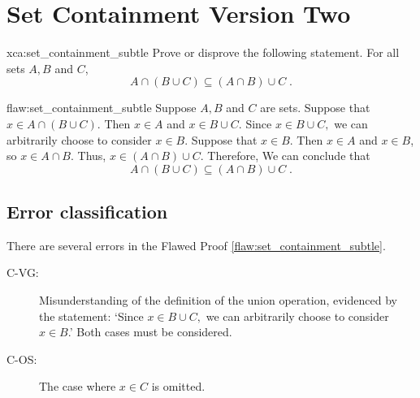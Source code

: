 \section{Set Containment Version Two}

\begin{xca}{xca:set_containment_subtle}
Prove or disprove the following statement. For all sets $A, B$ and $C$,
$$A \cap \left(B \cup C \right) \subseteq \left(A \cap B\right) \cup C\;.$$
\end{xca}

\begin{flaw}{flaw:set_containment_subtle} %
Suppose $A, B$ and $C$ are sets. Suppose that $x \in A \cap \left(B \cup C \right).$ Then $x\in A$ and $x \in B \cup C.$ Since $x \in B \cup C,$ we can arbitrarily choose to consider $x \in B$. 
Suppose that $x \in B$. Then $x \in A$ and $x \in B$, so $x \in A \cap B$. Thus, $x \in \left(A \cap B\right) \cup C.$ Therefore, We can conclude that $$A \cap \left(B \cup C \right) \subseteq \left(A \cap B\right) \cup C\;.$$
\end{flaw}

\clearpage
\subsection{Error classification}


There are several errors
 in the Flawed Proof \ref{flaw:set_containment_subtle}. %

 
 \begin{description}
  	\item[C-VG: ] Misunderstanding of the definition of the union operation, evidenced by the statement: `Since $x \in B \cup C,$ we can arbitrarily choose to consider $x \in B$.' Both cases must be considered.   
 	\item[C-OS: ] The case where $x \in C$ is omitted. 
 \end{description}

